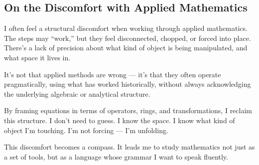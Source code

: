 \documentclass[12pt]{article}
\begin{document}
\subsection*{On the Discomfort with Applied Mathematics}

I often feel a structural discomfort when working through applied mathematics. The steps may “work,” but they feel disconnected, chopped, or forced into place. There’s a lack of precision about what kind of object is being manipulated, and what space it lives in.

It’s not that applied methods are wrong — it’s that they often operate pragmatically, using what has worked historically, without always acknowledging the underlying algebraic or analytical structure.

By framing equations in terms of operators, rings, and transformations, I reclaim this structure. I don't need to guess. I know the space. I know what kind of object I'm touching. I’m not forcing — I’m unfolding.

This discomfort becomes a compass. It leads me to study mathematics not just as a set of tools, but as a language whose grammar I want to speak fluently.


	
\end{document}

